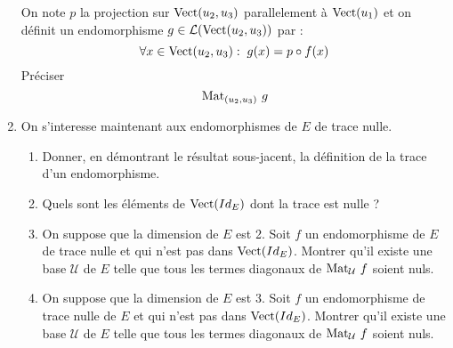 \begin{enumerate}
On note $p$ la projection sur $\operatorname{Vect}(u_2,u_3)$ parallelement à $\operatorname{Vect}(u_1)$ et on définit un endomorphisme $g\in \mathcal{L}(\operatorname{Vect}(u_2,u_3))$ par :
\[\forall x\in \operatorname{Vect}(u_2,u_3):\; g(x)=p\circ f(x)\]
Préciser 
\begin{displaymath}
 \operatorname{Mat}_{(u_2,u_3)}\,g
\end{displaymath}

\item On s'interesse maintenant aux endomorphismes de $E$ de trace nulle.
\begin{enumerate}
 \item Donner, en démontrant le résultat sous-jacent, la définition de la trace d'un endomorphisme.

\item Quels sont les éléments de $\operatorname{Vect} (Id_E)$ dont la trace est nulle ?

\item On suppose que la dimension de $E$ est 2. Soit $f$ un endomorphisme de $E$ de trace nulle et qui n'est pas dans $\operatorname{Vect} (Id_E)$. Montrer qu'il existe une base $\mathcal U$ de $E$ telle que tous les termes diagonaux de $\operatorname{Mat}_{\mathcal{U}}\, f$ soient nuls.


\item On suppose que la dimension de $E$ est 3. Soit $f$ un endomorphisme de trace nulle de $E$ et qui n'est pas dans $\operatorname{Vect} (Id_E)$.  Montrer qu'il existe une base $\mathcal U$ de $E$ telle que tous les termes diagonaux de $\operatorname{Mat}_{\mathcal{U}}\, f$ soient nuls.
\end{enumerate}

\end{enumerate}